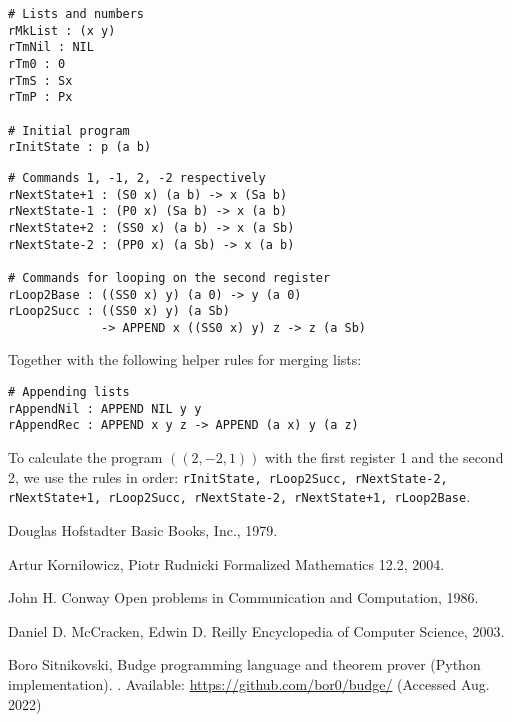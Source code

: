 \documentclass{article}
\begin{document}
\begin{minipage}{0.40\textwidth}
\begin{verbatim}
# Lists and numbers
rMkList : (x y)
rTmNil : NIL
rTm0 : 0
rTmS : Sx
rTmP : Px

# Initial program
rInitState : p (a b)
\end{verbatim}
\end{minipage}
\begin{minipage}{0.58\textwidth}
\begin{verbatim}
# Commands 1, -1, 2, -2 respectively
rNextState+1 : (S0 x) (a b) -> x (Sa b)
rNextState-1 : (P0 x) (Sa b) -> x (a b)
rNextState+2 : (SS0 x) (a b) -> x (a Sb)
rNextState-2 : (PP0 x) (a Sb) -> x (a b)

# Commands for looping on the second register
rLoop2Base : ((SS0 x) y) (a 0) -> y (a 0)
rLoop2Succ : ((SS0 x) y) (a Sb)
             -> APPEND x ((SS0 x) y) z -> z (a Sb)
\end{verbatim}
\end{minipage}

Together with the following helper rules for merging lists:

\begin{verbatim}
# Appending lists
rAppendNil : APPEND NIL y y
rAppendRec : APPEND x y z -> APPEND (a x) y (a z)
\end{verbatim}

To calculate the program $((2, -2, 1))$ with the first register 1 and the second 2, we use the rules in order: \texttt{rInitState, rLoop2Succ, rNextState-2, rNextState+1, rLoop2Succ, rNextState-2, rNextState+1, rLoop2Base}.

\begin{thebibliography}{1}

Douglas Hofstadter
\newblock Basic Books, Inc., 1979.

Artur Korniłowicz, Piotr Rudnicki
\newblock Formalized Mathematics 12.2, 2004.

John H. Conway
\newblock Open problems in Communication and Computation, 1986.

Daniel D. McCracken, Edwin D. Reilly
\newblock Encyclopedia of Computer Science, 2003.

Boro Sitnikovski,
\newblock Budge programming language and theorem prover (Python implementation).
\newblock [Online]. Available: \url{https://github.com/bor0/budge/} (Accessed Aug. 2022)

\end{thebibliography}
\end{document}
